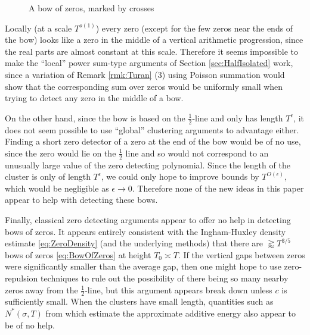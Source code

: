 \documentclass[12pt]{amsart}
\theoremstyle{plain}
\theoremstyle{definition}
\theoremstyle{remark}
\begin{document}
\begin{center}
\begin{figure}[h!!!]
\caption{A bow of zeros, marked by crosses} \label{fig:bow}
\end{figure}
\end{center}

Locally (at a scale $T^{o(1)}$) every zero (except for the few zeros near the ends of the bow) looks like a zero in the middle of a vertical arithmetic progression, since the real parts are almost constant at this scale. Therefore it seems impossible to make the ``local'' power sum-type arguments of Section \ref{sec:HalfIsolated} work, since a variation of Remark \ref{rmk:Turan} (3) using Poisson summation would show that the corresponding sum over zeros would be uniformly small when trying to detect any zero in the middle of a bow. 

On the other hand, since the bow is based on the $\frac{1}{2}$-line and only has length $T^\epsilon$, it does not seem possible to use ``global'' clustering arguments to advantage either. Finding a short zero detector of a zero at the end of the bow would be of no use, since the zero would lie on the $\frac{1}{2}$ line and so would not correspond to an unusually large value of the zero detecting polynomial. Since the length of the cluster is only of length $T^\epsilon$, we could only hope to improve bounds by $T^{O(\epsilon)}$, which would be negligible as $\epsilon\rightarrow 0$. Therefore none of the new ideas in this paper appear to help with detecting these bows.

Finally, classical zero detecting arguments appear to offer no help in detecting bows of zeros. It appears entirely consistent with the Ingham-Huxley density estimate \eqref{eq:ZeroDensity} (and the underlying methods) that there are $\gtrapprox T^{3/5}$ bows of zeros \eqref{eq:BowOfZeros} at height $T_0\asymp T$. If the vertical gaps between zeros were significantly smaller than the average gap, then one might hope to use zero-repulsion techniques to rule out the possibility of there being so many nearby zeros away from the $\frac{1}{2}$-line, but this argument appears break down unless $c$ is sufficiently small. When the clusters have small length, quantities such as $N^*(\sigma,T)$ from \cite{HeathBrownII,HeathBrownIII} which estimate the approximate additive energy also appear to be of no help.
\end{document}
